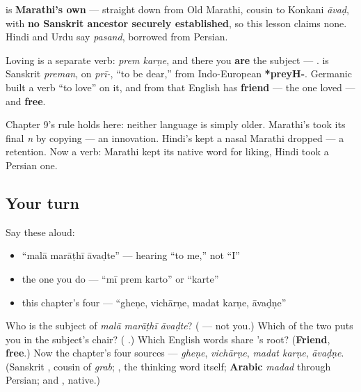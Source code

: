 \begin{cousinweb}
\textbf{} is \textbf{Marathi's own} — straight down from Old Marathi, cousin to Konkani \emph{āvaḍ}, with \textbf{no Sanskrit ancestor securely established}, so this lesson claims none. Hindi and Urdu say \textbf{} \emph{pasand}, borrowed from Persian.

Loving is a separate verb: \textbf{ } \emph{prem karṇe}, and there you \textbf{are} the subject — \textbf{  }. \textbf{} is Sanskrit \emph{preman}, on \textbf{} \emph{prī-}, \textquotedblleft{}to be dear,\textquotedblright{} from Indo-European \textbf{*preyH-}. Germanic built a verb \textquotedblleft{}to love\textquotedblright{} on it, and from that English has \textbf{friend} — the one loved — and \textbf{free}.
\end{cousinweb}

\begin{culture}
Chapter 9's rule holds here: neither language is simply older. Marathi's \textbf{} took its final \emph{n} by copying \textbf{} — an innovation. Hindi's \textbf{} kept a nasal Marathi dropped — a retention. Now a verb: Marathi kept its native word for liking, Hindi took a Persian one.
\end{culture}

\subsection*{Your turn}
Say these aloud:

\begin{itemize}
\raggedright
  \item \textquotedblleft{}malā marāṭhī āvaḍte\textquotedblright{} — hearing \textquotedblleft{}to me,\textquotedblright{} not \textquotedblleft{}I\textquotedblright{}
  \item the one you do — \textquotedblleft{}mī prem karto\textquotedblright{} or \textquotedblleft{}karte\textquotedblright{}
  \item this chapter's four — \textquotedblleft{}gheṇe, vichārṇe, madat karṇe, āvaḍṇe\textquotedblright{}
\end{itemize}

\begin{tcolorbox}[breakable,colback=teal!4,colframe=teal!35!black,title={Before you move on}]
Who is the subject of \emph{malā marāṭhī āvaḍte}? (\textbf{} — not you.) Which of the two puts you in the subject's chair? (\textbf{ }.) Which English words share \textbf{}'s root? (\textbf{Friend}, \textbf{free}.) Now the chapter's four sources — \emph{gheṇe}, \emph{vichārṇe}, \emph{madat karṇe}, \emph{āvaḍṇe}. (Sanskrit \textbf{}, cousin of \emph{grab}; \textbf{}, the thinking word itself; \textbf{Arabic} \emph{madad} through Persian; and \textbf{}, native.)
\end{tcolorbox}
